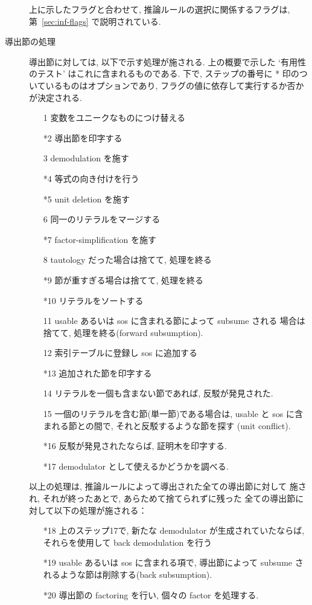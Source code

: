 \begin{description}
  上に示したフラグと合わせて, 推論ルールの選択に関係するフラグは, 
  第~\ref{sec:inf-flags} で説明されている. 

\item[導出節の処理] 導出節に対しては, 以下で示す処理が施される.
  上の概要で示した `有用性のテスト' はこれに含まれるものである.
  下で, ステップの番号に * 印のついているものはオプションであり,
  フラグの値に依存して実行するか否かが決定される.
  \begin{enumerate}
  \item[1] 変数をユニークなものにつけ替える
  \item[*2] 導出節を印字する
  \item[3] demodulation を施す
  \item[*4] 等式の向き付けを行う
  \item[*5] unit deletion を施す
  \item[6] 同一のリテラルをマージする
  \item[*7] factor-simplification を施す
  \item[8] tautology だった場合は捨てて, 処理を終る
  \item[*9] 節が重すぎる場合は捨てて, 処理を終る
  \item[*10] リテラルをソートする
  \item[11] usable あるいは sos に含まれる節によって subsume される
    場合は捨てて, 処理を終る(forward subsumption).
  \item[12] 索引テーブルに登録し sos に追加する
  \item[*13] 追加された節を印字する
  \item[14] リテラルを一個も含まない節であれば, 反駁が発見された.
  \item[15] 一個のリテラルを含む節(単一節)である場合は,
    usable と sos に含まれる節との間で, それと反駁するような節を探す
    (unit conflict). 
  \item[*16] 反駁が発見されたならば, 証明木を印字する.
  \item[*17] demodulator として使えるかどうかを調べる.
  \end{enumerate}

  以上の処理は, 推論ルールによって導出された全ての導出節に対して
  施され, それが終ったあとで, あらためて捨てられずに残った
  全ての導出節に対して以下の処理が施される：
  \begin{enumerate}
  \item[*18] 上のステップ17で, 新たな demodulator が生成されていたならば,
    それらを使用して back demodulation を行う
  \item[*19] usable あるいは sos に含まれる項で, 導出節によって subsume 
    されるような節は削除する(back subsumption).
  \item[*20] 導出節の factoring を行い, 個々の factor を処理する.
  \end{enumerate}
  
\end{description}

